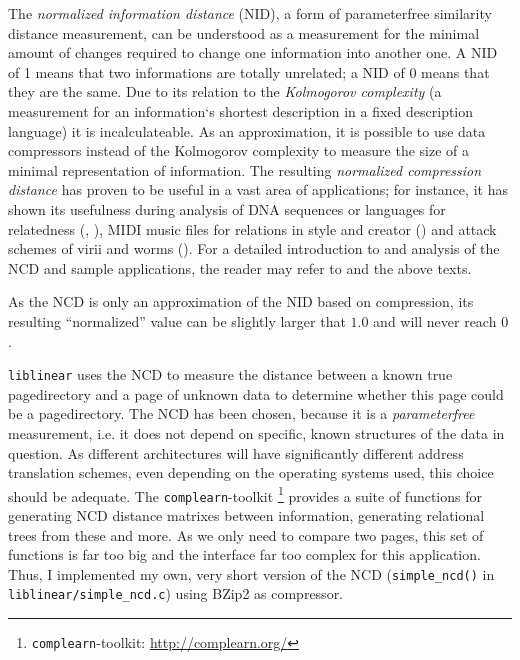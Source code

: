 \label{ATTstatistics} The \emph{normalized information distance} (NID), a form
of parameterfree similarity distance measurement, can be understood as a
measurement for the minimal amount of changes required to change one information
into another one.  A NID of 1 means that two informations are totally unrelated;
a NID of 0 means that they are the same.  Due to its relation to the
\emph{Kolmogorov complexity} (a measurement for an information`s shortest
description in a fixed description language) it is incalculateable.  As an
approximation, it is possible to use data compressors instead of the Kolmogorov
complexity to measure the size of a minimal representation of information. The
resulting \emph{normalized compression distance} has proven to be useful in a
vast area of applications; for instance, it has shown its usefulness during
analysis of DNA sequences or languages for relatedness
(\cite{clustering_by_compression:2005}, \cite{similarity_matrix:2004}), MIDI
music files for relations in style and creator
(\cite{clustering_by_compression:2005}) and attack schemes of virii and worms
(\cite{analysing_worms_with_ncd:2006}).  For a detailed introduction to and
analysis of the NCD and sample applications, the reader may refer to
\cite{kolmogorov:1997} and the above texts.

As the NCD is only an approximation of the NID based on compression, its
resulting ``normalized'' value can be slightly larger that $1.0$ and will never
reach $0$.

\texttt{liblinear} uses the NCD to measure the distance between a known true
pagedirectory and a page of unknown data to determine whether this page could be
a pagedirectory. The NCD has been chosen, because it is a \emph{parameterfree}
measurement, i.e. it does not depend on specific, known structures of the data
in question. As different architectures will have significantly different
address translation schemes, even depending on the operating systems used, this
choice should be adequate. The \texttt{complearn}-toolkit
\footnote{\texttt{complearn}-toolkit:
\href{http://complearn.org/}{http://complearn.org/}} provides a suite of
functions for generating NCD distance matrixes between information, generating
relational trees from these and more.  As we only need to compare two pages,
this set of functions is far too big and the interface far too complex for this
application.  Thus, I implemented my own, very short version of the NCD
(\texttt{simple\_ncd()} in \texttt{liblinear/simple\_ncd.c}) using BZip2 as
compressor.


